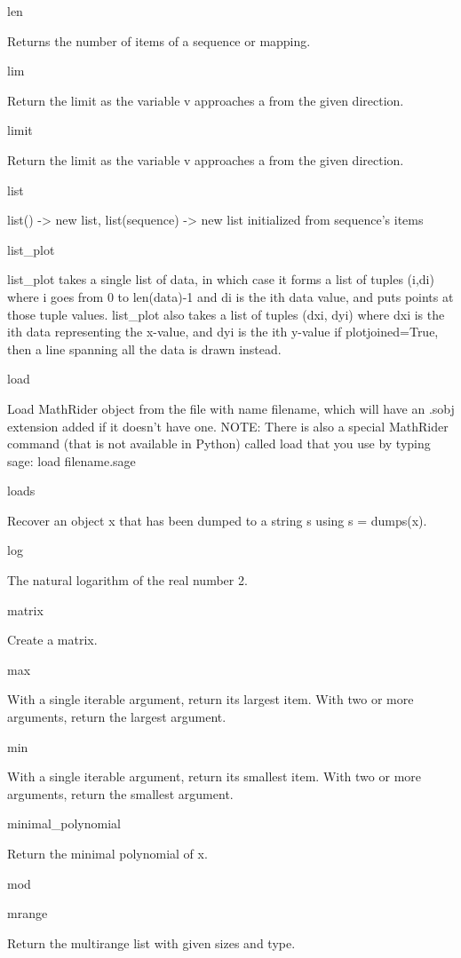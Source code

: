 \documentclass[12pt,oneside]{book}
\begin{document}
len

Returns the number of items of a sequence or mapping.

lim

Return the limit as the variable v approaches a from the given direction.

limit

Return the limit as the variable v approaches a from the given direction.

list

list() {}-{\textgreater} new list, list(sequence) {}-{\textgreater} new list initialized from sequence's items

list\_plot

list\_plot takes a single list of data, in which case it forms a list of tuples (i,di) where i goes from 0 to len(data){}-1 and di is the ith data value, and puts points at those tuple values. list\_plot also takes a list of tuples (dxi, dyi) where dxi is the ith data representing the x{}-value, and dyi is the ith y{}-value if plotjoined=True, then a line spanning all the data is drawn instead.

load

Load MathRider object from the file with name filename, which will have an .sobj extension added if it doesn't have one. NOTE: There is also a special MathRider command (that is not available in Python) called load that you use by typing sage: load filename.sage

loads

Recover an object x that has been dumped to a string s using s = dumps(x).

log

The natural logarithm of the real number 2.

matrix

Create a matrix.

max

With a single iterable argument, return its largest item. With two or more arguments, return the largest argument.

min

With a single iterable argument, return its smallest item. With two or more arguments, return the smallest argument.

minimal\_polynomial

Return the minimal polynomial of x.

mod


mrange

Return the multirange list with given sizes and type.
\end{document}

